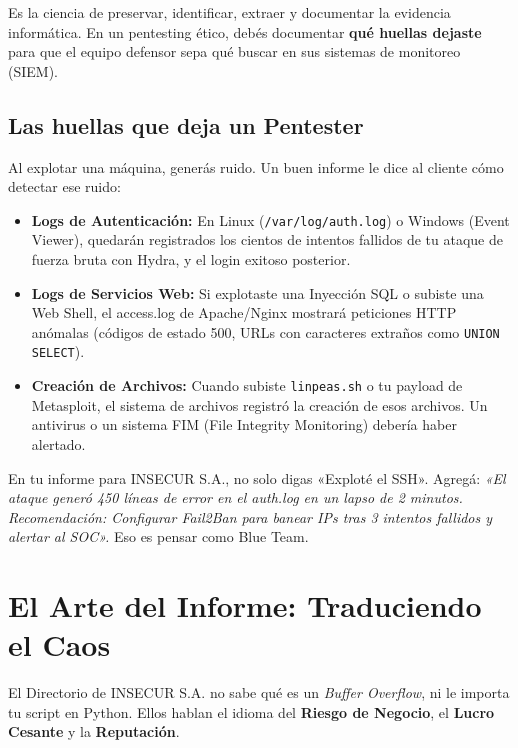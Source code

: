 \documentclass[11pt,a4paper]{article}
\begin{document}
\begin{definicion}
Es la ciencia de preservar, identificar, extraer y documentar la evidencia informática. En un pentesting ético, debés documentar \textbf{qué huellas dejaste} para que el equipo defensor sepa qué buscar en sus sistemas de monitoreo (SIEM).
\end{definicion}

\subsection{Las huellas que deja un Pentester}
Al explotar una máquina, generás ruido. Un buen informe le dice al cliente cómo detectar ese ruido:
\begin{itemize}[leftmargin=*]
  \item \textbf{Logs de Autenticación:} En Linux (\texttt{/var/log/auth.log}) o Windows (Event Viewer), quedarán registrados los cientos de intentos fallidos de tu ataque de fuerza bruta con Hydra, y el login exitoso posterior.
  \item \textbf{Logs de Servicios Web:} Si explotaste una Inyección SQL o subiste una Web Shell, el access.log de Apache/Nginx mostrará peticiones HTTP anómalas (códigos de estado 500, URLs con caracteres extraños como \texttt{UNION SELECT}).
  \item \textbf{Creación de Archivos:} Cuando subiste \texttt{linpeas.sh} o tu payload de Metasploit, el sistema de archivos registró la creación de esos archivos. Un antivirus o un sistema FIM (File Integrity Monitoring) debería haber alertado.
\end{itemize}

\begin{tip}
En tu informe para INSECUR S.A., no solo digas «Exploté el SSH». Agregá: \textit{«El ataque generó 450 líneas de error en el auth.log en un lapso de 2 minutos. Recomendación: Configurar Fail2Ban para banear IPs tras 3 intentos fallidos y alertar al SOC».} Eso es pensar como Blue Team.
\end{tip}

\section{El Arte del Informe: Traduciendo el Caos}
El Directorio de INSECUR S.A. no sabe qué es un \textit{Buffer Overflow}, ni le importa tu script en Python. Ellos hablan el idioma del \textbf{Riesgo de Negocio}, el \textbf{Lucro Cesante} y la \textbf{Reputación}.
\end{document}
